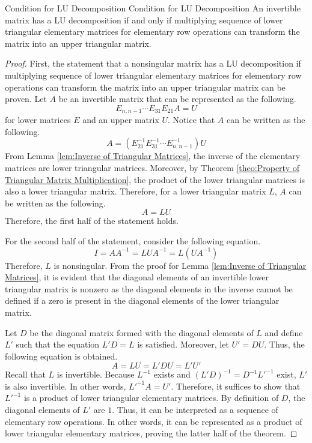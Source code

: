 \documentclass[../main.tex]{subfiles}
\begin{document}
\begin{theorem}{Condition for LU Decomposition}
{Condition for LU Decomposition}
An invertible matrix has a LU decomposition if and only if
multiplying sequence of lower triangular elementary matrices for
elementary row operations can transform the matrix into an upper
triangular matrix.
\end{theorem}
\begin{proof}
First, the statement that a nonsingular matrix has a LU decomposition
if multiplying sequence of lower triangular elementary matrices for
elementary row operations can transform the matrix into an upper
triangular matrix can be proven. Let $A$ be an invertible matrix
that can be represented as the following.
\[
E_{n,n-1} \cdots E_{31} E_{21} A = U
\]
for lower matrices $E$ and an upper matrix $U$. Notice that $A$ can
be written as the following.
\[
A = \left( E^{-1}_{21} E^{-1}_{31} \cdots E^{-1}_{n,n-1} \right) U
\]
From Lemma \ref{lem:Inverse of Triangular Matrices}, the inverse of
the elementary matrices are lower triangular matrices. Moreover,
by Theorem \ref{theo:Property of Triangular Matrix Multiplication},
the product of the lower triangular matrices is also a lower
triangular matrix. Therefore, for a lower triangular matrix $L$,
$A$ can be written as the following.
\[
A = LU
\]
Therefore, the first half of the statement holds.

For the second half of the statement, consider the following equation.
\[
I = AA^{-1} = LUA^{-1} = L \left( UA^{-1} \right)
\]
Therefore, $L$ is nonsingular. From the proof for Lemma
\ref{lem:Inverse of Triangular Matrices}, it is evident that the diagonal
elements of an invertible lower triangular matrix is nonzero as
the diagonal elements in the inverse cannot be defined if a zero is
present in the diagonal elements of the lower triangular matrix.

Let $D$ be the diagonal matrix formed with the diagonal elements of
$L$ and define $L'$ such that the equation $L'D = L$ is satisfied.
Moreover, let $U' = DU$. Thus, the following equation is obtained.
\[
A = LU = L'DU = L'U'
\]
Recall that $L$ is invertible. Because $L^{-1}$ exists and
$(L'D)^{-1} = D^{-1} L'^{-1}$ exist, $L'$ is also invertible.
In other words, $L'^{-1} A = U'$. Therefore, it suffices to show
that $L'^{-1}$ is a product of lower triangular elementary matrices.
By definition of $D$, the diagonal elements of $L'$ are $1$. Thus,
it can be interpreted as a sequence of elementary row operations.
In other words, it can be represented as a product of lower triangular
elementary matrices, proving the latter half of the theorem.
\end{proof}
\end{document}
